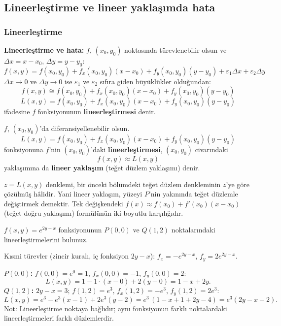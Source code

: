 \subsection{Lineerleştirme ve lineer yaklaşımda hata}

\subsubsection{Lineerleştirme}

\begin{tahta}
\textbf{Lineerleştirme ve hata:} $f$, $(x_0,y_0)$ noktasında türevlenebilir olsun ve $\Delta x=x-x_0$, $\Delta y=y-y_0$:
\[
f(x,y)=f(x_0,y_0)+f_x(x_0,y_0)(x-x_0)+f_y(x_0,y_0)(y-y_0)+\varepsilon_1\Delta x+\varepsilon_2\Delta y
\]
$\Delta x\to0$ ve $\Delta y\to0$ ise $\varepsilon_1$ ve $\varepsilon_2$ sıfıra giden büyüklükler olduğundan:
\[ f(x,y)\cong f(x_0,y_0)+f_x(x_0,y_0)(x-x_0)+f_y(x_0,y_0)(y-y_0) \]
\[ L(x,y)=f(x_0,y_0)+f_x(x_0,y_0)(x-x_0)+f_y(x_0,y_0)(y-y_0) \]
ifadesine $f$ fonksiyonunun \textbf{lineerleştirmesi} denir.
\end{tahta}

\begin{tanim}
$f$, $(x_0,y_0)$'da diferansiyellenebilir olsun.
\[
L(x,y)=f(x_0,y_0)+f_x(x_0,y_0)(x-x_0)+f_y(x_0,y_0)(y-y_0)
\]
fonksiyonuna $f$'nin $(x_0,y_0)$'daki \textbf{lineerleştirmesi}, $(x_0,y_0)$ civarındaki
\[ f(x,y)\approx L(x,y) \]
yaklaşımına da \textbf{lineer yaklaşım} (teğet düzlem yaklaşımı) denir.
\end{tanim}

\begin{bilgi}[Lineerleştirme = teğet düzlem]
$z=L(x,y)$ denklemi, bir önceki bölümdeki teğet düzlem denkleminin $z$'ye göre çözülmüş hâlidir. Yani lineer yaklaşım,
yüzeyi $P$'nin yakınında teğet düzlemle değiştirmek demektir. Tek değişkendeki $f(x)\approx f(x_0)+f'(x_0)(x-x_0)$
(teğet doğru yaklaşımı) formülünün iki boyutlu karşılığıdır.
\end{bilgi}

\begin{soru}
$f(x,y)=e^{2y-x}$ fonksiyonunun $P(0,0)$ ve $Q(1,2)$ noktalarındaki lineerleştirmelerini bulunuz.
\end{soru}
\begin{cevap}
Kısmi türevler (zincir kuralı, iç fonksiyon $2y-x$): $f_x=-e^{2y-x}$, $f_y=2e^{2y-x}$.

\textbf{$P(0,0)$:} $f(0,0)=e^0=1$, $f_x(0,0)=-1$, $f_y(0,0)=2$:
\[ L(x,y)=1-1\cdot(x-0)+2(y-0)=1-x+2y . \]
\textbf{$Q(1,2)$:} $2y-x=3$; $f(1,2)=e^3$, $f_x(1,2)=-e^3$, $f_y(1,2)=2e^3$:
\[ L(x,y)=e^3-e^3(x-1)+2e^3(y-2)=e^3\,(1-x+1+2y-4)=e^3(2y-x-2). \]
Not: Lineerleştirme noktaya bağlıdır; aynı fonksiyonun farklı noktalardaki lineerleştirmeleri farklı düzlemlerdir.
\end{cevap}

